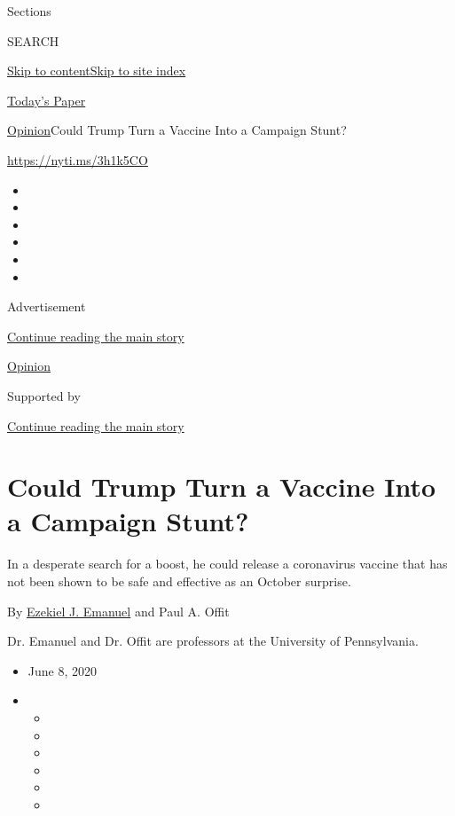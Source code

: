 Sections

SEARCH

\protect\hyperlink{site-content}{Skip to
content}\protect\hyperlink{site-index}{Skip to site index}

\href{https://myaccount.nytimes.com/auth/login?response_type=cookie\&client_id=vi}{}

\href{https://www.nytimes.com/section/todayspaper}{Today's Paper}

\href{/section/opinion}{Opinion}\textbar{}Could Trump Turn a Vaccine
Into a Campaign Stunt?

\href{https://nyti.ms/3h1k5CO}{https://nyti.ms/3h1k5CO}

\begin{itemize}
\item
\item
\item
\item
\item
\item
\end{itemize}

Advertisement

\protect\hyperlink{after-top}{Continue reading the main story}

\href{/section/opinion}{Opinion}

Supported by

\protect\hyperlink{after-sponsor}{Continue reading the main story}

\hypertarget{could-trump-turn-a-vaccine-into-a-campaign-stunt}{%
\section{Could Trump Turn a Vaccine Into a Campaign
Stunt?}\label{could-trump-turn-a-vaccine-into-a-campaign-stunt}}

In a desperate search for a boost, he could release a coronavirus
vaccine that has not been shown to be safe and effective as an October
surprise.

By \href{https://hcmg.wharton.upenn.edu/profile/zemanuel/}{Ezekiel J.
Emanuel} and Paul A. Offit

Dr. Emanuel and Dr. Offit are professors at the University of
Pennsylvania.

\begin{itemize}
\item
  June 8, 2020
\item
  \begin{itemize}
  \item
  \item
  \item
  \item
  \item
  \item
  \end{itemize}
\end{itemize}

